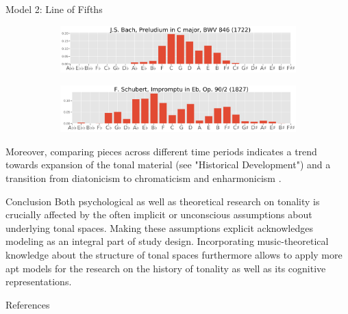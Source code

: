 \documentclass[final,cmyk]{beamer}
\begin{document}
\begin{frame}[t]
\begin{minipage}[t][.69\textheight][t]{\textwidth}
\begin{columns}[t]
\begin{column}{0.3\textwidth}
\begin{block}{Model 2: Line of Fifths}
\begin{figure}
				\begin{subfigure}{\textwidth} %
					\includegraphics[width=\textwidth]{img/gmm_bach.png}
				\end{subfigure}

				\begin{subfigure}{\textwidth} %
					\includegraphics[width=\textwidth]{img/gmm_schubert.png}
				\end{subfigure}
			\end{figure}

			Moreover, comparing pieces across different time periods indicates a trend towards expansion of the tonal material (see "Historical Development") and a transition from diatonicism to chromaticism and enharmonicism \autocite{Gardonyi2002}.
      \end{block}

			\begin{block}{Conclusion}
				Both psychological as well as theoretical research on tonality is
				crucially affected by the often implicit or unconscious
				\alert{assumptions} about underlying tonal spaces.
				Making these assumptions explicit acknowledges \alert{modeling} as an
				integral part of study design.
				Incorporating music-theoretical knowledge about the structure of tonal
				spaces furthermore allows to apply more apt models for
				the research on the \alert{history of tonality} as well as its
				\alert{cognitive representations}.
      \end{block}

			\begin{block}{References}
          \printbibliography
      \end{block}



\end{column}
\end{columns}
\end{minipage}
\end{frame}
\end{document}
